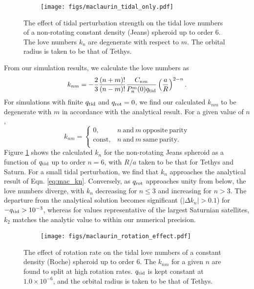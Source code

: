 \begin{figure}[h!]  
  \centering
    \texttt{[image: figs/maclaurin\_tidal\_only.pdf]}
\caption{ The effect of tidal perturbation strength on the tidal love numbers of a
non-rotating constant density (Jeans) spheroid up to order 6. The love numbers $k_n$ are degenerate
with respect to $m$. The orbital radius is taken to be that of Tethys.}
\label{fig:maclaurin_tidal_only}
\end{figure}

From our simulation results, we calculate the love numbers as
%
\begin{equation}
\begin{aligned}
    k_{nm} = -\frac{2}{3}\frac{(n+m)!}{(n-m)!}\frac{C_{nm}}{P_n^m(0)q_{\rm tid}}
    \left( \frac{a}{R} \right)^{2-n}.
\end{aligned}
\label{eq:kn}
\end{equation}
%
For simulations with finite $q_{\rm tid}$ and $q_{\rm rot}=0$, we find our calculated
$k_{nm}$ to be degenerate with $m$ in accordance with the analytical result. For a
given value of $n$, 
%
\begin{equation}
    k_{nm} = \begin{cases}
        0, & n \mathrm{~and~} m \mathrm{~opposite~parity} \\
        \mathrm{const}, & n \mathrm{~and~} m \mathrm{~same~parity}. \\
    \end{cases}
    \label{eq:degenerate}
\end{equation}
%
Figure \ref{fig:maclaurin_tidal_only} shows the calculated $k_n$ for the non-rotating
Jeans spheroid as a function of $q_{\rm tid}$ up to order $n=6$, with $R/a$ taken
to be that for Tethys and Saturn. For a small tidal perturbation, we find that $k_n$
approaches the analytical result of Eqn. \eqref{eq:mac_kn}. Conversely, as $q_{\rm
rot}$ approaches unity from below, the love numbers diverge, with $k_n$ decreasing
for $n\leq3$ and increasing for $n>3$. The departure from the analytical solution
becomes significant ($\left|\Delta k_n\right| > 0.1$) for $-q_{\rm tid}>10^{-3}$,
whereas for values representative of the largest Saturnian satellites, $k_2$ matches
the analytic value to within our numerical precision.

\begin{figure}[h!]  
  \centering
    \texttt{[image: figs/maclaurin\_rotation\_effect.pdf]}
\caption{ The effect of rotation rate on the tidal love numbers of a constant density
    (Roche) spheroid up to order 6. The $k_{nm}$ for a given $n$ are found to split
    at high rotation rates. $q_{\rm tid}$ is kept constant at $1.0\times10^{-6}$, and
    the orbital radius is taken to be that of Tethys.}
\label{fig:maclaurin_rotation_effect}
\end{figure}


